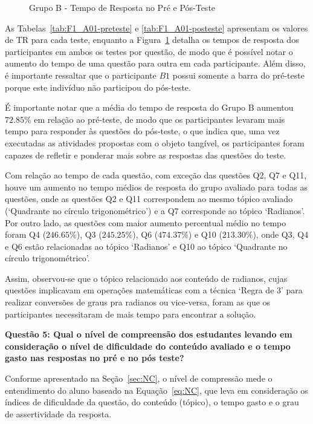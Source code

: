 \begin{figure}[htb]
\begin{tikzpicture}
	\end{tikzpicture}
	\caption{Grupo B - Tempo de Resposta no Pré e Pós-Teste}
	\label{fig:F1_TR_H01_preposteste}
\end{figure}


As Tabelas~\ref{tab:F1_A01-preteste} e \ref{tab:F1_A01-posteste} apresentam os valores de TR para cada teste, enquanto a Figura~\ref{fig:F1_TR_H01_preposteste} detalha os tempos de resposta dos participantes em ambos os testes por questão, de modo que é possível notar o aumento do tempo de uma questão para outra em cada participante. Além disso, é importante ressaltar que o participante $B1$ possui somente a barra do pré-teste porque este indivíduo não participou do pós-teste.

É importante notar que a média do tempo de resposta do Grupo B aumentou $72.85\%$ em relação ao pré-teste, de modo que os participantes levaram mais tempo para responder às questões do pós-teste, o que indica que, uma vez executadas as atividades propostas com o objeto tangível, os participantes foram capazes de refletir e ponderar mais sobre as respostas das questões do teste.

Com relação ao tempo de cada questão, com exceção das questões Q2, Q7 e Q11, houve um aumento no tempo médios de resposta do grupo avaliado para todas as questões, onde as questões Q2 e Q11 correspondem ao mesmo tópico avaliado (`Quadrante no círculo trigonométrico') e a Q7 corresponde ao tópico `Radianos'. Por outro lado, as questões com maior aumento percentual médio no tempo foram Q4 ($246.65\%$), Q3 ($245.25\%$), Q6 ($474.37\%$) e Q10 ($213.30\%$), onde Q3, Q4 e Q6 estão relacionadas ao tópico `Radianos' e Q10 ao tópico `Quadrante no círculo trigonométrico'. 

Assim, observou-se que o tópico relacionado aos conteúdo de radianos, cujas questões implicavam em operações matemáticas com a técnica `Regra de 3' para realizar conversões de graus pra radianos ou vice-versa, foram as que os participantes necessitaram de mais tempo para encontrar a solução.


\textbf{Questão 5: Qual o nível de compreensão dos estudantes levando em consideração o nível de dificuldade do conteúdo avaliado e o tempo gasto nas respostas no pré e no pós teste?}

Conforme apresentado na Seção~\ref{sec:NC}, o nível de compressão mede o entendimento do aluno baseado na Equação~\ref{eq:NC}, que leva em consideração os índices de dificuldade da questão, do conteúdo (tópico), o tempo gasto e o grau de assertividade da resposta.


